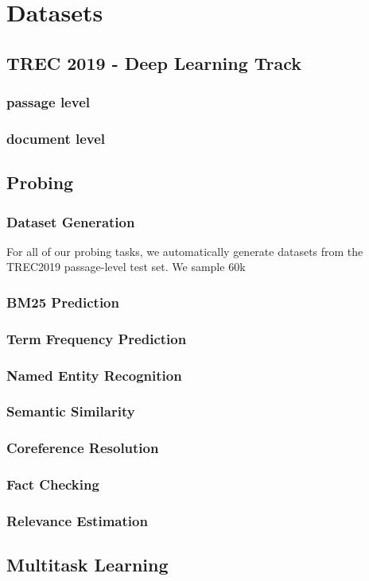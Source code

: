 \chapter{Datasets}
\label{chap:datasets}
\section{TREC 2019 - Deep Learning Track}
\label{sec:trec2019}
\subsection{passage level}
\subsection{document level}

\section{Probing}

\subsection{Dataset Generation}
For all of our probing tasks, we automatically generate datasets from the TREC2019 passage-level test set. We sample $60$k 

\subsection{BM25 Prediction}

\subsection{Term Frequency Prediction}

\subsection{Named Entity Recognition}

\subsection{Semantic Similarity}

\subsection{Coreference Resolution}

\subsection{Fact Checking}

\subsection{Relevance Estimation}

\section{Multitask Learning}